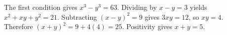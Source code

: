 The first condition gives $x^3-y^3=63$. Dividing by $x-y=3$ yields $x^2+xy+y^2=21$. Subtracting $(x-y)^2=9$ gives $3xy=12$, so $xy=4$. Therefore $(x+y)^2=9+4(4)=25$. Positivity gives $\boxed{x+y=5}$.
